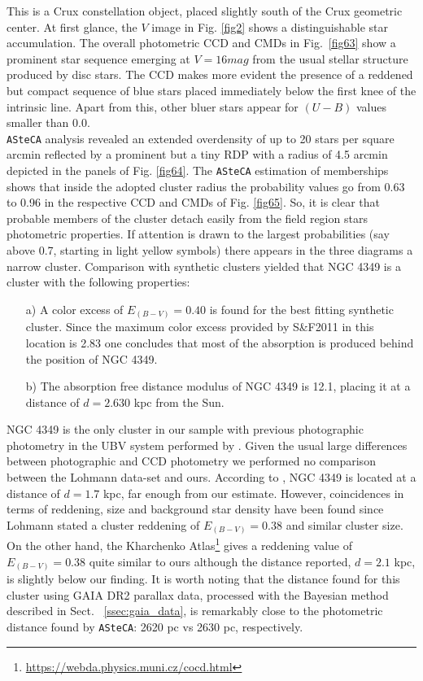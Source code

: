 \documentclass{aa}
\begin{document}
This is a Crux constellation object, placed slightly south of the Crux geometric
center. At first glance, the $V$ image in Fig. \ref{fig2} shows a
distinguishable star accumulation. The overall photometric CCD and CMDs in
Fig.~\ref{fig63} show a prominent star sequence emerging at $V=16 mag$ from the
usual stellar structure produced by disc stars. The CCD makes more evident the
presence of a reddened but compact sequence of blue stars placed immediately
below the first knee of the intrinsic line. Apart from this, other bluer stars
appear for $(U-B)$ values smaller than 0.0.\\ 

\texttt{ASteCA} analysis revealed an extended overdensity of up to 20 stars per
square arcmin reflected by a prominent but a tiny RDP with a radius of 4.5
arcmin depicted in the panels of Fig. \ref{fig64}.
The \texttt{ASteCA} estimation of memberships shows that inside the adopted
cluster radius the probability values go from 0.63 to 0.96 in the respective CCD
and CMDs of Fig. \ref{fig65}. So, it is clear that probable members of the
cluster detach easily from the field region stars photometric properties. If
attention is drawn to the largest probabilities (say above 0.7, starting in
light yellow symbols) there appears in the three diagrams a narrow cluster.
Comparison with synthetic clusters yielded
that NGC 4349 is a cluster with the following properties:

\begin{itemize}
    \item [a)] A color excess of $E_{(B-V)}= 0.40$ is found for the best fitting
    synthetic cluster. Since the maximum color excess provided by
    S\&F2011 in this location is 2.83 one concludes that most of the
    absorption is produced behind the position of NGC 4349.
    \item [b)] The absorption free distance modulus of NGC 4349 is 12.1,
    placing it at a distance of $d=2.630$ kpc from the Sun. 
\end{itemize}

NGC 4349 is the only cluster in our sample with previous photographic photometry
in the UBV system performed by \cite{Lohmann_1961}. Given the usual large
differences between photographic and CCD photometry we performed no comparison
between the Lohmann data-set and ours. According to \cite{Lohmann_1961}, NGC
4349 is located at a distance of $d = 1.7$ kpc, far enough from our estimate.
However, coincidences in terms of reddening, size and background star density
have been found since Lohmann stated a cluster reddening of $E_{(B-V)} = 0.38$
and similar cluster size. On the other hand, the Kharchenko
Atlas\footnote{\url{https://webda.physics.muni.cz/cocd.html}}
\citep{Kharchenko_2005} gives a reddening value of $E_{(B-V)} = 0.38$ quite
similar to ours although the distance reported, $d = 2.1$ kpc, is slightly below
our finding.
It is worth noting that the distance found for this cluster using GAIA DR2
parallax data, processed with the Bayesian method described in Sect.~
\ref{ssec:gaia_data}, is remarkably close to the photometric distance found by 
\texttt{ASteCA}: 2620 pc vs 2630 pc, respectively.
\end{document}
